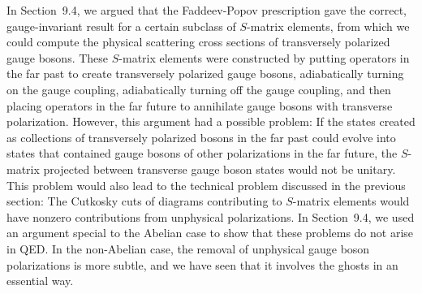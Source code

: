 In Section~9.4, we argued that the Faddeev-Popov prescription gave the
correct, gauge-invariant result for a certain subclass of $S$-matrix
elements, from which we could compute the physical scattering cross sections
of transversely polarized gauge bosons.  These $S$-matrix elements were
constructed by putting operators in the far past to create transversely
polarized gauge bosons, adiabatically turning on the gauge coupling,
adiabatically turning off the gauge coupling, and then placing operators in
the far future to annihilate gauge bosons with transverse polarization.
However, this argument had a possible problem: If the states created as
collections of transversely polarized bosons in the far past could evolve
into states that contained gauge bosons of other polarizations in the far
future, the $S$-matrix projected between transverse gauge boson states would
not be unitary.  This problem would also lead to the technical problem
discussed in the previous section: The Cutkosky cuts of diagrams contributing
to $S$-matrix elements would have nonzero contributions from unphysical
polarizations.  In Section~9.4, we used an argument special to the Abelian
case to show that these problems do not arise in QED.  In the non-Abelian
case, the removal of unphysical gauge boson polarizations is more subtle, and
we have seen that it involves the ghosts in an essential way.

